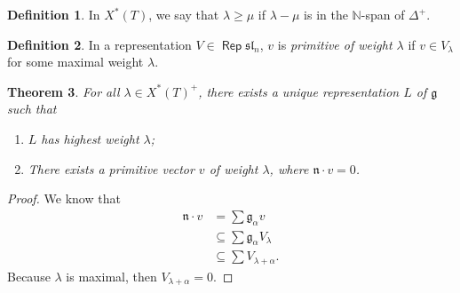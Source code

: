 \documentclass[leqno, openany]{memoir}
\newtheorem{thm}{Theorem}[chapter]
\theoremstyle{definition}
\newtheorem{defn}[thm]{Definition}
\theoremstyle{remark}
\theoremstyle{plain}
\theoremstyle{definition}
\theoremstyle{remark}
\newcommand{\mf}[1]{\mathfrak{#1}}
\newcommand{\mb}[1]{\mathbb{#1}}
\DeclareMathOperator{\Rep}{\mathsf{Rep}}
\begin{document}
\begin{defn} In $X^*(T)$, we say that $\lambda \geq \mu$ if $\lambda - \mu$ is
in the $\mb{N}$-span of $\Delta^+$.  \end{defn}

\begin{defn} In a representation $V \in \Rep \mf{sl}_n$, $v$ is
\textit{primitive of weight $\lambda$} if $v \in V_{\lambda}$ for some maximal
weight $\lambda$.  \end{defn}

\begin{thm} For all $\lambda \in X^*(T)^+$, there exists a unique
    representation $L$ of $\mf{g}$ such that \begin{enumerate} \item $L$ has
        highest weight $\lambda$; \item There exists a primitive vector $v$ of
        weight $\lambda$, where $\mf{n} \cdot v = 0$.  \end{enumerate}
    \end{thm}

\begin{proof} We know that \begin{align*} \mf{n} \cdot v &= \sum
\mf{g}_{\alpha} v \\ &\subseteq \sum \mf{g_{\alpha}} V_{\lambda} \\ &\subseteq
\sum V_{\lambda + \alpha}.  \end{align*} Because $\lambda$ is maximal, then
$V_{\lambda + \alpha} = 0$.  \end{proof}
\end{document}
